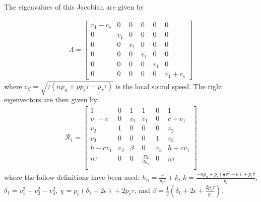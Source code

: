 \documentclass[onecolumn]{aastex62}
\begin{document}
\noindent The eigenvalues of this Jacobian are given by

\begin{align}
\Lambda =
\begin{bmatrix}
  v_{1} - c_{s} & 0 & 0& 0& 0& 0\\
  0 & v_{1} & 0 & 0 & 0 & 0 \\
  0 & 0 & v_{1} & 0 & 0 & 0 \\
  0 & 0 & 0 & v_{1} & 0 & 0 \\
  0 & 0 & 0 & 0 & v_{1} & 0 \\
  0 & 0 & 0 & 0 & 0 & v_{1} + c_{s}
\end{bmatrix}
\end{align}
where $c_{S} = \sqrt{\tau (n p_{n} + p p_{\epsilon}\tau - p_{\tau}\tau)}$ is
the local sound speed. The right eigenvectors are then given by
\begin{align*}
  \mathcal{R}_{1} =
  \left[
  \begin{array}{cccccc}
   1 & 0 & 1 & 1 & 0 & 1 \\
   v_{1}-c & 0 & v_{1} & v_{1} & 0 & c+v_{1} \\
   v_{2} & 1 & 0 & 0 & 0 & v_{2} \\
   v_{3} & 0 & 0 & 0 & 1 & v_{3} \\
   h-c v_{1} & v_{2} & \beta & 0 & v_{3} & h+c v_{1} \\
   n \tau  & 0 & 0 & \frac{\tau  \chi }{2 p_{n}} & 0 & n \tau  \\
  \end{array}
  \right]
\end{align*}
where the follow definitions have been used:
$h_{n} = \frac{c^2}{p_{\epsilon}\tau} + k $, $k = \frac{-n p_{n}
+ p_{\epsilon} (\frac{1}{2}v^2 + \epsilon) + p_{\tau}\tau}{p_{\epsilon}}$,
$\delta_{1} = v_{1}^{2}-v_{2}^{2}-v_{3}^{2}$,
$\chi = p_{\epsilon} ( \delta_{1} + 2\epsilon) + 2p_{\tau}\tau$, and
$\beta = \frac{1}{2} (\delta_{1}+2 \epsilon +\frac{2 p_{\tau} \tau }{p_{\epsilon}})$.
\end{document}
